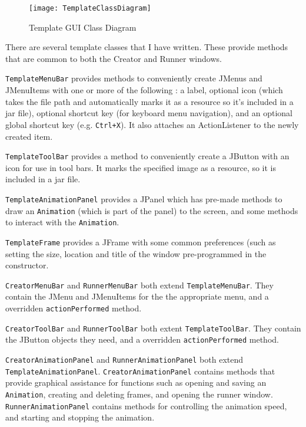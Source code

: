 \documentclass[a4paper, 11pt]{article}
\begin{document}
\begin{figure}[H]
\centering
\texttt{[image: TemplateClassDiagram]}
\caption{Template GUI Class Diagram}
\label{TemplateClassDiagram}
\end{figure}

There are several template classes that I have written. These provide methods that are common to both the Creator and Runner windows.

\vspace{\baselineskip}

\texttt{TemplateMenuBar} provides methods to conveniently create JMenus and JMenuItems with one or more of the following : a label, optional icon (which takes the file path and automatically marks it as a resource so it's included in a jar file), optional shortcut key (for keyboard menu navigation), and an optional global shortcut key (e.g. \texttt{Ctrl+X}). It also attaches an ActionListener to the newly created item.

\texttt{TemplateToolBar} provides a method to conveniently create a JButton with an icon for use in tool bars. It marks the specified image as a resource, so it is included in a jar file.

\texttt{TemplateAnimationPanel} provides a JPanel which has pre-made methods to draw an \texttt{Animation} (which is part of the panel) to the screen, and some methods to interact with the \texttt{Animation}.

\texttt{TemplateFrame} provides a JFrame with some common preferences (such as setting the size, location and title of the window pre-programmed in the constructor.

\vspace{\baselineskip}

\texttt{CreatorMenuBar} and \texttt{RunnerMenuBar} both extend \texttt{TemplateMenuBar}. They contain the JMenu and JMenuItems for the the appropriate menu, and a overridden \texttt{actionPerformed} method.

\texttt{CreatorToolBar} and \texttt{RunnerToolBar} both extent \texttt{TemplateToolBar}. They contain the JButton objects they need, and a overridden \texttt{actionPerformed} method.

\texttt{CreatorAnimationPanel} and \texttt{RunnerAnimationPanel} both extend \texttt{TemplateAnimationPanel}. \texttt{CreatorAnimationPanel} contains methods that provide graphical assistance for functions such as opening and saving an \texttt{Animation}, creating and deleting frames, and opening the runner window. \texttt{RunnerAnimationPanel} contains methods for controlling the animation speed, and starting and stopping the animation.
\end{document}
